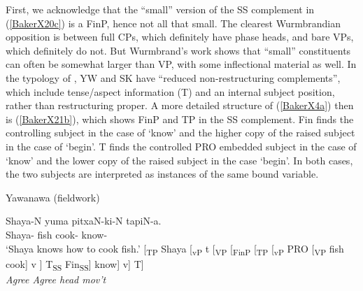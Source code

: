 \documentclass[output=paper]{langscibook}
\begin{document}
First, we acknowledge that the “small” version of the SS complement in (\ref{BakerX20c}) is a FinP, hence not all that small. The clearest Wurmbrandian opposition is between full CPs, which definitely have phase heads, and bare VPs, which definitely do not. But Wurmbrand’s work shows that “small” constituents can often be somewhat larger than VP, with some inflectional material as well. In the typology of \citet{wurmbrand2001infinitives}, YW and SK have “reduced non-restructuring complements”, which include tense/aspect information (T) and an internal subject position, rather than restructuring proper. A more detailed structure of (\ref{BakerX4a}) then is (\ref{BakerX21b}), which shows FinP and TP in the SS complement. Fin finds the controlling subject in the case of `know’ and the higher copy of the raised subject in the case of `begin’. T finds the controlled PRO embedded subject in the case of `know’ and the lower copy of the raised subject in the case `begin’. In both cases, the two subjects are interpreted as instances of the same bound variable.

\begin{exe}
    \ex Yawanawa (fieldwork) \label{BakerX21}
	    \begin{xlist}
			\ex \label{BakerX21a}
			\gll Shaya-N yuma pitxaN-ki-N tapiN-a.\\
			     Shaya- fish cook- know-\\
			    \glt `Shaya knows how to cook fish.'
			\ex \label{BakerX21b}
			    \small[\textsubscript{TP }Shaya [\textsubscript{vP }t [\textsubscript{VP }[\textsubscript{FinP }[\textsubscript{TP }[\textsubscript{vP } PRO [\textsubscript{VP }fish cook] v ]  T\textsubscript{SS} Fin\textsubscript{SS}] know] v] T]\\
			    \textit{Agree \hspace{7.5em} Agree \hspace{11em}head mov't}
		\end{xlist}
\end{exe}
\end{document}
